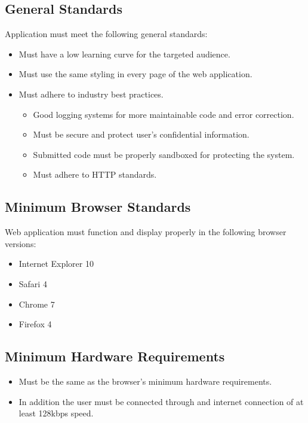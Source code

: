 \label{sec:stand}
\subsection{General Standards}

Application must meet the following general standards:

\begin{itemize}
\item Must have a low learning curve for the targeted audience.
\item Must use the same styling in every page of the web application.
\item Must adhere to industry best practices.
\begin{itemize}
\item Good logging systems for more maintainable code and error correction.
\item Must be secure and protect user's confidential information.
\item Submitted code must be properly sandboxed for protecting the system.
\item Must adhere to HTTP standards.
\end{itemize}
\end{itemize}

\subsection{Minimum Browser Standards}

Web application must function and display properly in the following browser
versions:
\begin{itemize}
\item Internet Explorer 10
\item Safari 4
\item Chrome 7
\item Firefox 4
\end{itemize}

\subsection{Minimum Hardware Requirements}
\begin{itemize}
\item Must be the same as the browser's minimum hardware requirements.
\item In addition the user must be connected through and internet connection of
at least 128kbps speed.
\end{itemize}\newpage
